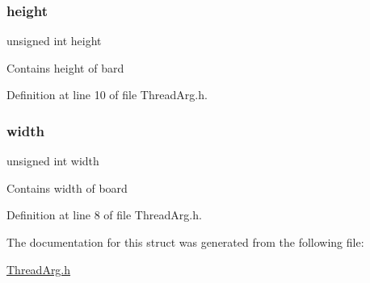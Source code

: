 \subsubsection{\texorpdfstring{height}{height}}
{\footnotesize\ttfamily unsigned int height}

Contains height of bard 

Definition at line 10 of file Thread\+Arg.\+h.

\mbox{\label{struct_thread_arg_aca34d28e3d8bcbcadb8edb4e3af24f8c}} 
\subsubsection{\texorpdfstring{width}{width}}
{\footnotesize\ttfamily unsigned int width}

Contains width of board 

Definition at line 8 of file Thread\+Arg.\+h.



The documentation for this struct was generated from the following file\+:\begin{DoxyCompactItemize}
\item 
\mbox{\hyperlink{_thread_arg_8h}{Thread\+Arg.\+h}}\end{DoxyCompactItemize}
